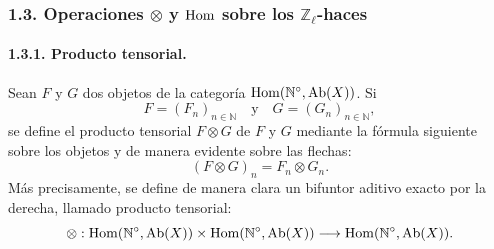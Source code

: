 \subsubsection*{1.3. Operaciones \(\otimes\) y \(\operatorname{Hom}\) sobre los \(\mathbb Z_\ell\)-haces}

\paragraph{1.3.1. Producto tensorial.}
Sean \(F\) y \(G\) dos objetos de la categoría \(\operatorname{Hom}(\mathbb N^\circ,\operatorname{Ab}(X))\). Si
\[
F=(F_n)_{n\in\mathbb N}\quad\text{y}\quad G=(G_n)_{n\in\mathbb N},
\]
se define el producto tensorial \(F\otimes G\) de \(F\) y \(G\) mediante la fórmula siguiente sobre los objetos y de manera evidente sobre las flechas:
\[
(F\otimes G)_n=F_n\otimes G_n.
\]
Más precisamente, se define de manera clara un bifuntor aditivo exacto por la derecha, llamado producto tensorial:
\[
\otimes:\operatorname{Hom}(\mathbb N^\circ,\operatorname{Ab}(X))\times \operatorname{Hom}(\mathbb N^\circ,\operatorname{Ab}(X))
\longrightarrow \operatorname{Hom}(\mathbb N^\circ,\operatorname{Ab}(X)).
\]
